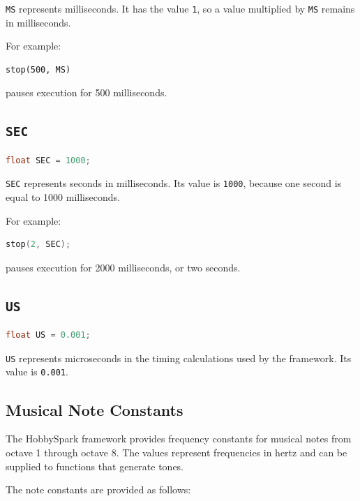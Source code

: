 \texttt{MS} represents milliseconds. It has the value \texttt{1}, so a
value multiplied by \texttt{MS} remains in milliseconds.

For example:

\begin{lstlisting}
stop(500, MS)
\end{lstlisting}

pauses execution for 500 milliseconds.

\subsection{\texttt{SEC}}

\begin{lstlisting}[language=C++]
float SEC = 1000;
\end{lstlisting}

\texttt{SEC} represents seconds in milliseconds. Its value is
\texttt{1000}, because one second is equal to 1000 milliseconds.

For example:

\begin{lstlisting}[language=C++]
stop(2, SEC);
\end{lstlisting}

pauses execution for 2000 milliseconds, or two seconds.

\subsection{\texttt{US}}

\begin{lstlisting}[language=C++]
float US = 0.001;
\end{lstlisting}

\texttt{US} represents microseconds in the timing calculations used by
the framework. Its value is \texttt{0.001}.

\subsection{Musical Note Constants}

The HobbySpark framework provides frequency constants for musical notes
from octave 1 through octave 8. The values represent frequencies in
hertz and can be supplied to functions that generate tones.

The note constants are provided as follows:

